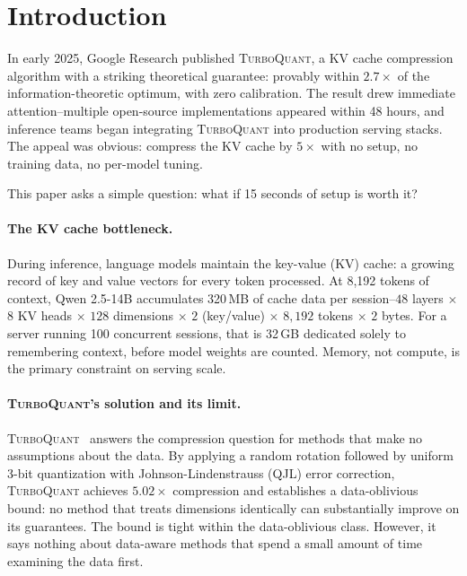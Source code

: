 \documentclass[11pt]{article}
\newcommand{\TQ}{\textsc{TurboQuant}}
\begin{document}
\newpage

\section{Introduction}
\label{sec:intro}

In early 2025, Google Research published \TQ{}, a KV cache compression
algorithm with a striking theoretical guarantee: provably within $2.7\times$
of the information-theoretic optimum, with zero calibration.  The result drew
immediate attention--multiple open-source implementations appeared within 48
hours, and inference teams began integrating \TQ{} into production serving
stacks.  The appeal was obvious: compress the KV cache by $5\times$ with no
setup, no training data, no per-model tuning.

This paper asks a simple question: what if 15 seconds of setup is worth it?

\paragraph{The KV cache bottleneck.}
During inference, language models maintain the key-value (KV) cache: a growing record of
key and value vectors for every token processed.  At 8{,}192 tokens of
context, Qwen 2.5-14B accumulates 320\,MB of cache data per session--$48$
layers $\times$ $8$ KV heads $\times$ $128$ dimensions $\times$ $2$
(key/value) $\times$ $8{,}192$ tokens $\times$ $2$ bytes.  For a server
running 100 concurrent sessions, that is 32\,GB dedicated solely to
remembering context, before model weights are counted.  Memory, not
compute, is the primary constraint on serving scale.

\paragraph{\TQ{}'s solution and its limit.}
\TQ{}~\citep{zandieh2025turboquant} answers the compression question for
methods that make no assumptions about the data.  By applying a random
rotation followed by uniform 3-bit quantization with Johnson-Lindenstrauss
(QJL) error correction, \TQ{} achieves $5.02\times$ compression and
establishes a data-oblivious bound: no method that treats dimensions
identically can substantially improve on its guarantees.  The bound is tight
within the data-oblivious class.  However, it says nothing about data-aware
methods that spend a small amount of time examining the data first.
\end{document}

